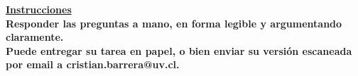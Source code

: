 \documentclass[11pt, letterpaper, addpoints]{exam}
\begin{document}


\vspace{1mm}
\thispagestyle{empty}
\vspace{5mm}

\centering
\textbf{\underline{Instrucciones}}\\
\vspace{2mm} 
{\small \bfseries 
Responder las preguntas a mano, en forma legible y
argumentando claramente.\\
Puede entregar su tarea en papel, o bien enviar su versión escaneada por email a
cristian.barrera@uv.cl.\\}
\vspace{10mm}

%



%

\end{document}
